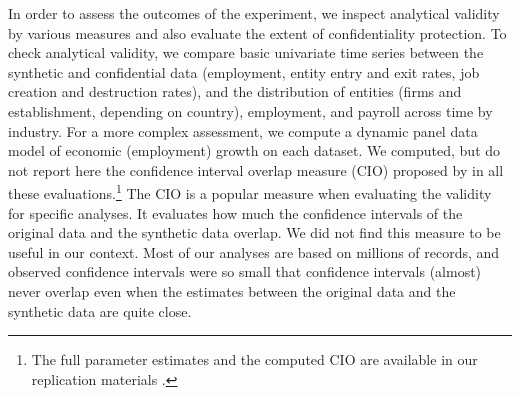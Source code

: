\documentclass[10pt,twoside]{article}
\begin{document}
In order to assess the outcomes of the experiment, we inspect analytical validity by various measures and also evaluate the extent of confidentiality protection. To check analytical validity, we compare basic univariate time series between the synthetic and confidential data (employment, entity entry and exit rates, job creation and destruction rates), and the distribution of entities (firms and establishment, depending on country),  employment, and payroll across time by industry. For a more complex assessment, we compute a dynamic panel data model of economic (employment) growth on each dataset. 
We computed, but do not report here the confidence interval overlap measure (CIO) proposed by \citet{tas2006} in all these evaluations.\footnote{The full parameter estimates and the computed CIO are available in our replication materials \parencite{SIT-paper-repo}.}
The CIO is a popular measure when evaluating the validity for specific analyses. It evaluates how much the confidence intervals of the original data and the synthetic data overlap. We did not find this measure to be useful in our context. Most of our analyses are based on millions of records, and observed confidence intervals were so small that confidence intervals (almost) never overlap even when the estimates between the original data and the synthetic data are quite close. 
\end{document}
